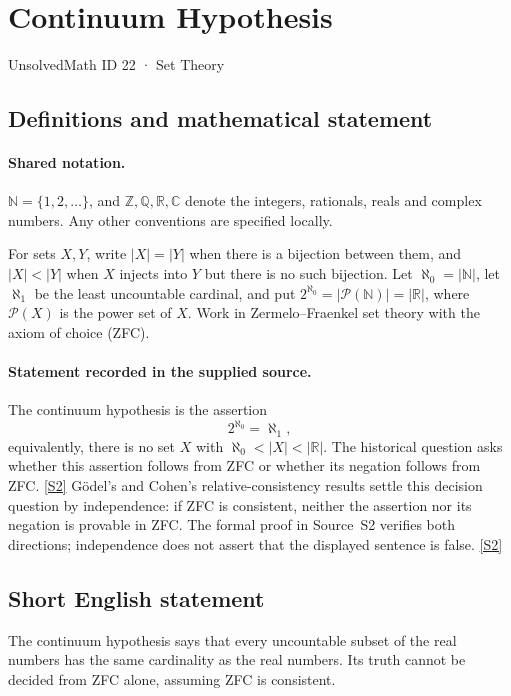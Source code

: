 \documentclass[11pt]{article}
\newcommand{\sref}[2]{\hyperlink{source:#1:#2}{[S#2]}}
\begin{document}
\setcounter{section}{21}
\section{Continuum Hypothesis}\label{22}
{\small\sffamily UnsolvedMath ID 22 · Set Theory}
\subsection{Definitions and mathematical statement}

\paragraph{Shared notation.}$\mathbb N=\{1,2,\ldots\}$, and $\mathbb Z,\mathbb Q,\mathbb R,\mathbb C$ denote the integers, rationals, reals and complex numbers. Any other conventions are specified locally.


For sets $X,Y$, write $|X|=|Y|$ when there is a bijection between them, and $|X|<|Y|$ when $X$ injects into $Y$ but there is no such bijection. Let $\aleph_0=|\mathbb N|$, let $\aleph_1$ be the least uncountable cardinal, and put $2^{\aleph_0}=|\mathcal P(\mathbb N)|=|\mathbb R|$, where $\mathcal P(X)$ is the power set of $X$. Work in Zermelo--Fraenkel set theory with the axiom of choice (ZFC).
\paragraph{Statement recorded in the supplied source.}
The continuum hypothesis is the assertion
\[
 2^{\aleph_0}=\aleph_1,
\]
equivalently, there is no set $X$ with $\aleph_0<|X|<|\mathbb R|$. The historical question asks whether this assertion follows from ZFC or whether its negation follows from ZFC. \sref{22}{2}
Gödel's and Cohen's relative-consistency results settle this decision question by independence: if ZFC is consistent, neither the assertion nor its negation is provable in ZFC. The formal proof in Source~S2 verifies both directions; independence does not assert that the displayed sentence is false. \sref{22}{2}
\subsection{Short English statement}
The continuum hypothesis says that every uncountable subset of the real numbers has the same cardinality as the real numbers. Its truth cannot be decided from ZFC alone, assuming ZFC is consistent.
\end{document}
